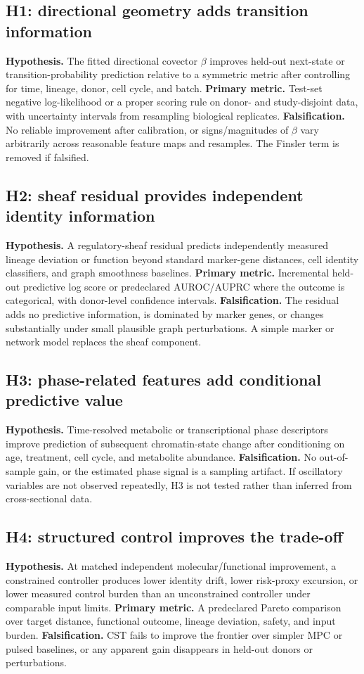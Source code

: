 \documentclass[11pt,a4paper]{article}
\theoremstyle{definition}
\theoremstyle{remark}
\begin{document}
\subsection{H1: directional geometry adds transition information}
\textbf{Hypothesis.} The fitted directional covector $\beta$ improves held-out next-state or transition-probability prediction relative to a symmetric metric after controlling for time, lineage, donor, cell cycle, and batch. \textbf{Primary metric.} Test-set negative log-likelihood or a proper scoring rule on donor- and study-disjoint data, with uncertainty intervals from resampling biological replicates. \textbf{Falsification.} No reliable improvement after calibration, or signs/magnitudes of $\beta$ vary arbitrarily across reasonable feature maps and resamples. The Finsler term is removed if falsified.

\subsection{H2: sheaf residual provides independent identity information}
\textbf{Hypothesis.} A regulatory-sheaf residual predicts independently measured lineage deviation or function beyond standard marker-gene distances, cell identity classifiers, and graph smoothness baselines. \textbf{Primary metric.} Incremental held-out predictive log score or predeclared AUROC/AUPRC where the outcome is categorical, with donor-level confidence intervals. \textbf{Falsification.} The residual adds no predictive information, is dominated by marker genes, or changes substantially under small plausible graph perturbations. A simple marker or network model replaces the sheaf component.

\subsection{H3: phase-related features add conditional predictive value}
\textbf{Hypothesis.} Time-resolved metabolic or transcriptional phase descriptors improve prediction of subsequent chromatin-state change after conditioning on age, treatment, cell cycle, and metabolite abundance. \textbf{Falsification.} No out-of-sample gain, or the estimated phase signal is a sampling artifact. If oscillatory variables are not observed repeatedly, H3 is not tested rather than inferred from cross-sectional data.

\subsection{H4: structured control improves the trade-off}
\textbf{Hypothesis.} At matched independent molecular/functional improvement, a constrained controller produces lower identity drift, lower risk-proxy excursion, or lower measured control burden than an unconstrained controller under comparable input limits. \textbf{Primary metric.} A predeclared Pareto comparison over target distance, functional outcome, lineage deviation, safety, and input burden. \textbf{Falsification.} CST fails to improve the frontier over simpler MPC or pulsed baselines, or any apparent gain disappears in held-out donors or perturbations.
\end{document}

